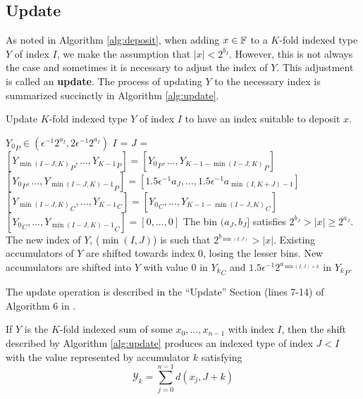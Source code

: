   \subsection{Update}
    \label{sec:primitiveops_update}
    As noted in Algorithm \ref{alg:deposit}, when adding $x \in \mathbb{F}$ to a $K$-fold indexed type $Y$ of index $I$, we make the assumption that $|x| < 2^{b_I}$. However, this is not always the case and sometimes it is necessary to adjust the index of $Y$. This adjustment is called an \textbf{update}. The process of updating $Y$ to the necessary index is summarized succinctly in Algorithm \ref{alg:update}.

    \begin{samepage}
    \begin{alg}
      Update $K$-fold indexed type $Y$ of index $I$ to have an index suitable to deposit $x$.
      \begin{algorithmic}[1]
        \Require
          \Statex ${Y_0}_P \in (\epsilon^{-1}  2^{a_{I}}, 2  \epsilon^{-1}  2^{a_I})$
          \State $I$ = 
          \State $J$ = 
            \State $[{Y_{\min(I - J, K)}}_P, ..., {Y_{K - 1}}_P] = [{Y_0}_P, ..., {Y_{K - 1 - \min(I - J, K)}}_P]$
            \State $[{Y_0}_P, ..., {Y_{\min(I - J, K) - 1}}_P] = [1.5  \epsilon^{-1}  a_{J}, ..., 1.5  \epsilon^{-1}  a_{\min(I, K + J) - 1}]$
            \State $[{Y_{\min(I - J, K)}}_C, ..., {Y_{K - 1}}_C] = [{Y_0}_C, ..., {Y_{K - 1 - \min(I - J, K)}}_C]$
            \State $[{Y_0}_C, ..., {Y_{\min(I - J, K) - 1}}_C] = [0, ..., 0]$
          \EndIf
        \EndFunction
        \Ensure
          \Statex The bin $(a_{J}, b_{J}]$ satisfies $2^{b_{J}} > |x| \geq 2^{a_{J}}$.
          \Statex The new index of $Y$, ($\min(I, J)$) is such that $2^{b_{\min(I, J)}} > |x|$.
          \Statex Existing accumulators of $Y$ are shifted towards index $0$, losing the lesser bins.
          \Statex New accumulators are shifted into $Y$ with value $0$ in ${Y_k}_C$ and $1.5  \epsilon^{-1}  2^{a_{\min(I, J) + k}}$ in ${Y_k}_P$.
      \end{algorithmic}
      \label{alg:update}
    \end{alg}
    \end{samepage}

    The update operation is described in the ``Update'' Section (lines 7-14) of Algorithm $6$ in \cite{repsum}.

    If $Y$ is the $K$-fold indexed sum of some $x_0, ..., x_{n - 1}$ with index $I$, then the shift described by Algorithm \ref{alg:update} produces an indexed type of index $J < I$ with the value represented by accumulator $k$ satisfying
    \begin{equation*}
      \mathcal{Y}_k = \sum\limits_{j = 0}^{n - 1} d(x_j, J + k)
    \end{equation*}

